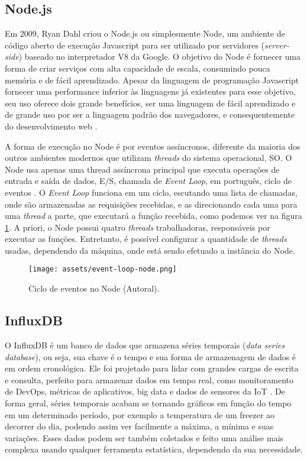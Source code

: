 \subsection{Node.js}
\label{fund:node}
Em 2009, Ryan Dahl criou o Node.js ou simplesmente Node, um ambiente de código aberto de execução Javascript para ser utilizado por servidores (\textit{server-side}) baseado no interpretador V8 da Google. O objetivo do Node é fornecer uma forma de criar serviços com alta capacidade de escala, consumindo pouca memória e de fácil aprendizado. Apesar da linguagem de programação Javascript fornecer uma performance inferior às linguagens já existentes para esse objetivo, seu uso oferece dois grande benefícios, ser uma linguagem de fácil aprendizado e de grande uso por ser a linguagem padrão dos navegadores, e consequentemente do desenvolvimento web \cite{tilkov2010node}.

A forma de execução no Node é por eventos assíncronos, diferente da maioria dos outros ambientes modernos que utilizam \textit{threads} do sistema operacional, SO. O Node usa apenas uma thread assíncrona principal que executa operações de entrada e saída de dados, E/S, chamada de \textit{Event Loop}, em português, ciclo de eventos \cite{nodejsAbout}. O \textit{Event Loop} funciona em um ciclo, escutando uma lista de chamadas, onde são armazenadas as requisições recebidas, e as direcionando cada uma para uma \textit{thread} a parte, que executará a função recebida, como podemos ver na figura \ref{fig:event-loop-node}. A priori, o  Node possui quatro \textit{threads} trabalhadoras, responsáveis por executar as funções. Entretanto, é possível configurar a quantidade de \textit{threads} usadas, dependendo da máquina, onde está sendo efetuado a instância do Node.

\begin{figure}[H]
  \centering
  \texttt{[image: assets/event-loop-node.png]} 
  \caption{Ciclo de eventos no Node (Autoral).}
  \label{fig:event-loop-node} 
\end{figure}

\subsection{InfluxDB}
\label{fund:influxdb}
O InfluxDB é um banco de dados que armazena séries temporais (\textit{data series database}), ou seja, sua chave é o tempo e sua forma de armazenagem de dados é em ordem cronológica. Ele foi projetado para lidar com grandes cargas de escrita e consulta, perfeito para armazenar dados em tempo real, como monitoramento de DevOps, métricas de aplicativos, big data e dados de sensores da IoT \cite{giacobbe2018implementation}. De forma geral, séries temporais acabam se tornando gráficos em função do tempo em um determinado período, por exemplo a temperatura de um freezer ao decorrer do dia, podendo assim ver facilmente a máxima, a mínima e suas variações. Esses dados podem ser também coletados e feito uma análise mais complexa usando qualquer ferramenta estatística, dependendo da sua necessidade.

